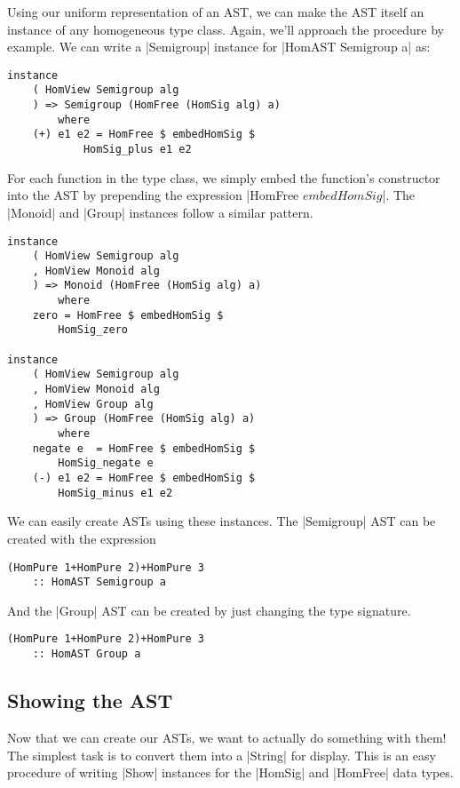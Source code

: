 \documentclass[preprint]{sigplanconf}
\theoremstyle{definition}
\begin{document}

Using our uniform representation of an AST,
we can make the AST itself an instance of any homogeneous type class.
Again, we'll approach the procedure by example.
We can write a |Semigroup| instance for |HomAST Semigroup a| as:
\begin{lstlisting}
instance
    ( HomView Semigroup alg
    ) => Semigroup (HomFree (HomSig alg) a)
        where
    (+) e1 e2 = HomFree $ embedHomSig $
            HomSig_plus e1 e2
\end{lstlisting}
For each function in the type class,
we simply embed the function's constructor into the AST by prepending the expression |HomFree $ embedHomSig $|.
The |Monoid| and |Group| instances follow a similar pattern.
\begin{lstlisting}
instance
    ( HomView Semigroup alg
    , HomView Monoid alg
    ) => Monoid (HomFree (HomSig alg) a)
        where
    zero = HomFree $ embedHomSig $
        HomSig_zero

instance
    ( HomView Semigroup alg
    , HomView Monoid alg
    , HomView Group alg
    ) => Group (HomFree (HomSig alg) a)
        where
    negate e  = HomFree $ embedHomSig $
        HomSig_negate e
    (-) e1 e2 = HomFree $ embedHomSig $
        HomSig_minus e1 e2
\end{lstlisting}
We can easily create ASTs using these instances.
The |Semigroup| AST can be created with the expression
\begin{lstlisting}
(HomPure 1+HomPure 2)+HomPure 3
    :: HomAST Semigroup a
\end{lstlisting}
And the |Group| AST can be created by just changing the type signature.
\begin{lstlisting}
(HomPure 1+HomPure 2)+HomPure 3
    :: HomAST Group a
\end{lstlisting}

\subsection{Showing the AST}
Now that we can create our ASTs, we want to actually do something with them!
The simplest task is to convert them into a |String| for display.
This is an easy procedure of writing |Show| instances for the |HomSig| and |HomFree| data types.
\end{document}
